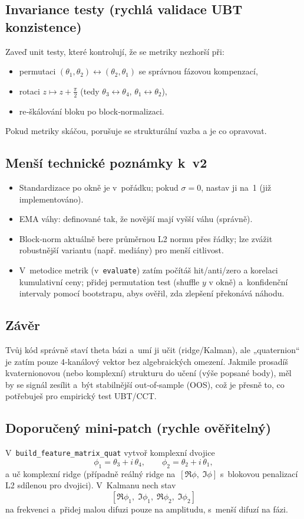 \documentclass{article}
\begin{document}
\subsection*{Invariance testy (rychlá validace UBT konzistence)}

Zaveď unit testy, které kontrolují, že se metriky nezhorší při:
\begin{itemize}
  \item permutaci $(\theta_1,\theta_2)\leftrightarrow(\theta_2,\theta_1)$ se správnou fázovou kompenzací,
  \item rotaci $z \mapsto z + \frac{\pi}{2}$ (tedy $\theta_3 \leftrightarrow \theta_4$, $\theta_1 \leftrightarrow \theta_2$),
  \item re‑škálování bloku po block‑normalizaci.
\end{itemize}
Pokud metriky skáčou, porušuje se strukturální vazba a je co opravovat.

\subsection*{Menší technické poznámky k v2}

\begin{itemize}
  \item Standardizace po okně je v pořádku; pokud $\sigma = 0$, nastav ji na 1 (již implementováno).
  \item EMA váhy: definované tak, že novější mají vyšší váhu (správně).
  \item Block‑norm aktuálně bere průměrnou L2 normu přes řádky; lze zvážit robustnější variantu (např. mediány) pro menší citlivost.
  \item V metodice metrik (v \texttt{evaluate}) zatím počítáš hit/anti/zero a korelaci kumulativní ceny; přidej permutation test (shuffle $y$ v okně) a konfidenční intervaly pomocí bootstrapu, abys ověřil, zda zlepšení překonává náhodu.
\end{itemize}

\subsection*{Závěr}

Tvůj kód správně staví theta bázi a umí ji učit (ridge/Kalman), ale „quaternion“ je zatím pouze 4‑kanálový vektor bez algebraických omezení. Jakmile prosadíš kvaternionovou (nebo komplexní) strukturu do učení (výše popsané body), měl by se signál zesílit a být stabilnější out‑of‑sample (OOS), což je přesně to, co potřebuješ pro empirický test UBT/CCT.

\subsection*{Doporučený mini‑patch (rychle ověřitelný)}

V \texttt{build\_feature\_matrix\_quat} vytvoř komplexní dvojice
\[
  \phi_1 = \theta_3 + i\,\theta_4,
  \qquad
  \phi_2 = \theta_2 + i\,\theta_1,
\]
a uč komplexní ridge (případně reálný ridge na $[\Re \phi,\; \Im \phi]$ s blokovou penalizací L2 sdílenou pro dvojici). V Kalmanu nech stav 
\[
  [\Re \phi_1,\; \Im \phi_1,\; \Re \phi_2,\; \Im \phi_2]
\]
na frekvenci a přidej malou difuzi pouze na amplitudu, s menší difuzí na fázi.
\end{document}
